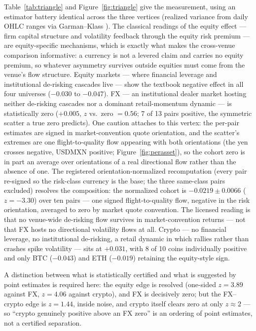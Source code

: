\documentclass[11pt]{article}
\begin{document}
Table~\ref{tab:triangle} and Figure~\ref{fig:triangle} give the measurement,
using an estimator battery identical across the three vertices (realized
variance from daily OHLC ranges via Garman--Klass \citep{garman1980}). The
classical readings of the equity effect --- firm capital structure
\citep{christie1982} and volatility feedback through the equity risk premium
\citep{bekaert2000} --- are equity-specific mechanisms, which is exactly what
makes the cross-venue comparison informative: a currency is not a levered
claim and carries no equity premium, so whatever asymmetry survives outside
equities must come from the venue's flow structure. Equity markets
--- where financial leverage and institutional de-risking cascades live ---
show the textbook negative effect in all four universes ($-0.030$ to
$-0.047$). FX --- an institutional dealer market hosting neither de-risking
cascades nor a dominant retail-momentum dynamic --- is
statistically zero ($+0.005$, $z$ vs.\ zero $= 0.56$; 7 of 13 pairs positive,
the symmetric scatter a true zero predicts). One caution attaches to
this vertex: the per-pair estimates are signed in market-convention
quote orientation, and the scatter's extremes are one flight-to-quality
flow appearing with both orientations (the yen crosses negative, USDMXN
positive; Figure~\ref{fig:perasset}), so the cohort zero is in part an
average over orientations of a real directional flow rather than the
absence of one. The registered orientation-normalized recomputation
(every pair re-signed so the risk-class currency is the base; the three
same-class pairs excluded) resolves the composition: the normalized
cohort is $-0.0219 \pm 0.0066$ ($z = -3.30$) over ten pairs --- one
signed flight-to-quality flow, negative in the risk orientation, averaged
to zero by market quote convention. The licensed reading is that no
venue-wide
de-risking flow survives in market-convention returns --- not that FX
hosts no directional volatility flows at all. Crypto --- no financial leverage,
no institutional de-risking, a retail dynamic in which rallies rather than
crashes spike volatility --- sits at $+0.031$, with 8 of 10 coins individually
positive and only BTC ($-0.043$) and ETH ($-0.019$) retaining the equity-style
sign.

A distinction between what is statistically certified and what is suggested
by point estimates is required here: the equity
edge is resolved (one-sided
$z = 3.89$ against FX, $z = 4.06$ against crypto), and FX is decisively zero;
but the FX--crypto edge is $z = 1.44$, inside noise, and crypto itself clears
zero at only $z \approx 2$ --- so ``crypto genuinely positive above an FX
zero'' is an ordering of point estimates, not a certified separation.
\end{document}
